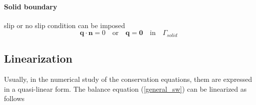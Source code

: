 \paragraph{Solid boundary} slip or no slip condition can be imposed
\begin{equation*}
    \mathbf{q} \cdot \mathbf{n} = 0 \quad \text{or} \quad \mathbf{q} = \mathbf{0} \quad \text{in} \quad \Gamma_{solid}
\end{equation*}






\subsection{Linearization}

Usually, in the numerical study of the conservation equations, them are expressed in a quasi-linear form. The balance equation (\ref{general_sw}) can be linearized as follows


